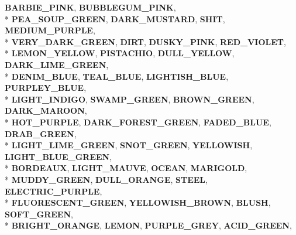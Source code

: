 \begin{DoxyCompactItemize}
{\bfseries B\+A\+R\+B\+I\+E\+\_\+\+P\+I\+NK}, 
{\bfseries B\+U\+B\+B\+L\+E\+G\+U\+M\+\_\+\+P\+I\+NK}, 
\\*
{\bfseries P\+E\+A\+\_\+\+S\+O\+U\+P\+\_\+\+G\+R\+E\+EN}, 
{\bfseries D\+A\+R\+K\+\_\+\+M\+U\+S\+T\+A\+RD}, 
{\bfseries S\+H\+IT}, 
{\bfseries M\+E\+D\+I\+U\+M\+\_\+\+P\+U\+R\+P\+LE}, 
\\*
{\bfseries V\+E\+R\+Y\+\_\+\+D\+A\+R\+K\+\_\+\+G\+R\+E\+EN}, 
{\bfseries D\+I\+RT}, 
{\bfseries D\+U\+S\+K\+Y\+\_\+\+P\+I\+NK}, 
{\bfseries R\+E\+D\+\_\+\+V\+I\+O\+L\+ET}, 
\\*
{\bfseries L\+E\+M\+O\+N\+\_\+\+Y\+E\+L\+L\+OW}, 
{\bfseries P\+I\+S\+T\+A\+C\+H\+IO}, 
{\bfseries D\+U\+L\+L\+\_\+\+Y\+E\+L\+L\+OW}, 
{\bfseries D\+A\+R\+K\+\_\+\+L\+I\+M\+E\+\_\+\+G\+R\+E\+EN}, 
\\*
{\bfseries D\+E\+N\+I\+M\+\_\+\+B\+L\+UE}, 
{\bfseries T\+E\+A\+L\+\_\+\+B\+L\+UE}, 
{\bfseries L\+I\+G\+H\+T\+I\+S\+H\+\_\+\+B\+L\+UE}, 
{\bfseries P\+U\+R\+P\+L\+E\+Y\+\_\+\+B\+L\+UE}, 
\\*
{\bfseries L\+I\+G\+H\+T\+\_\+\+I\+N\+D\+I\+GO}, 
{\bfseries S\+W\+A\+M\+P\+\_\+\+G\+R\+E\+EN}, 
{\bfseries B\+R\+O\+W\+N\+\_\+\+G\+R\+E\+EN}, 
{\bfseries D\+A\+R\+K\+\_\+\+M\+A\+R\+O\+ON}, 
\\*
{\bfseries H\+O\+T\+\_\+\+P\+U\+R\+P\+LE}, 
{\bfseries D\+A\+R\+K\+\_\+\+F\+O\+R\+E\+S\+T\+\_\+\+G\+R\+E\+EN}, 
{\bfseries F\+A\+D\+E\+D\+\_\+\+B\+L\+UE}, 
{\bfseries D\+R\+A\+B\+\_\+\+G\+R\+E\+EN}, 
\\*
{\bfseries L\+I\+G\+H\+T\+\_\+\+L\+I\+M\+E\+\_\+\+G\+R\+E\+EN}, 
{\bfseries S\+N\+O\+T\+\_\+\+G\+R\+E\+EN}, 
{\bfseries Y\+E\+L\+L\+O\+W\+I\+SH}, 
{\bfseries L\+I\+G\+H\+T\+\_\+\+B\+L\+U\+E\+\_\+\+G\+R\+E\+EN}, 
\\*
{\bfseries B\+O\+R\+D\+E\+A\+UX}, 
{\bfseries L\+I\+G\+H\+T\+\_\+\+M\+A\+U\+VE}, 
{\bfseries O\+C\+E\+AN}, 
{\bfseries M\+A\+R\+I\+G\+O\+LD}, 
\\*
{\bfseries M\+U\+D\+D\+Y\+\_\+\+G\+R\+E\+EN}, 
{\bfseries D\+U\+L\+L\+\_\+\+O\+R\+A\+N\+GE}, 
{\bfseries S\+T\+E\+EL}, 
{\bfseries E\+L\+E\+C\+T\+R\+I\+C\+\_\+\+P\+U\+R\+P\+LE}, 
\\*
{\bfseries F\+L\+U\+O\+R\+E\+S\+C\+E\+N\+T\+\_\+\+G\+R\+E\+EN}, 
{\bfseries Y\+E\+L\+L\+O\+W\+I\+S\+H\+\_\+\+B\+R\+O\+WN}, 
{\bfseries B\+L\+U\+SH}, 
{\bfseries S\+O\+F\+T\+\_\+\+G\+R\+E\+EN}, 
\\*
{\bfseries B\+R\+I\+G\+H\+T\+\_\+\+O\+R\+A\+N\+GE}, 
{\bfseries L\+E\+M\+ON}, 
{\bfseries P\+U\+R\+P\+L\+E\+\_\+\+G\+R\+EY}, 
{\bfseries A\+C\+I\+D\+\_\+\+G\+R\+E\+EN}, 

\end{DoxyCompactItemize}
